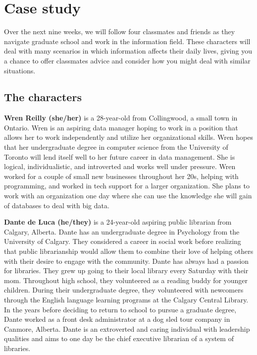 \documentclass[
  letterpaper,
  DIV=11,
  numbers=noendperiod]{scrreprt}
\begin{document}
\section{Case study}\label{case-study}

Over the next nine weeks, we will follow four classmates and friends as
they navigate graduate school and work in the information field. These
characters will deal with many scenarios in which information affects
their daily lives, giving you a chance to offer classmates advice and
consider how you might deal with similar situations.

\subsection{The characters}\label{the-characters}

\textbf{Wren Reilly (she/her)} is a 28-year-old from Collingwood, a
small town in Ontario. Wren is an aspiring data manager hoping to work
in a position that allows her to work independently and utilize her
organizational skills. Wren hopes that her undergraduate degree in
computer science from the University of Toronto will lend itself well to
her future career in data management. She is logical, individualistic,
and introverted and works well under pressure. Wren worked for a couple
of small new businesses throughout her 20s, helping with programming,
and worked in tech support for a larger organization. She plans to work
with an organization one day where she can use the knowledge she will
gain of databases to deal with big data.

\textbf{Dante de Luca (he/they)} is a 24-year-old aspiring public
librarian from Calgary, Alberta. Dante has an undergraduate degree in
Psychology from the University of Calgary. They considered a career in
social work before realizing that public librarianship would allow them
to combine their love of helping others with their desire to engage with
the community. Dante has always had a passion for libraries. They grew
up going to their local library every Saturday with their mom.
Throughout high school, they volunteered as a reading buddy for younger
children. During their undergraduate degree, they volunteered with
newcomers through the English language learning programs at the Calgary
Central Library. In the years before deciding to return to school to
pursue a graduate degree, Dante worked as a front desk administrator at
a dog sled tour company in Canmore, Alberta. Dante is an extroverted and
caring individual with leadership qualities and aims to one day be the
chief executive librarian of a system of libraries.
\end{document}
